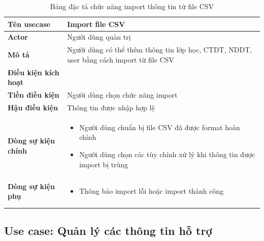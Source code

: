 \documentclass[report.tex]{subfiles}
\begin{document}
\pagebreak %
\begin{table}[!ht]
\begin{longtable}{|p{4cm}|p{12cm}|}
\hline
\textbf{Tên usecase} & \textbf{Import file CSV} \\
\hline
\textbf{Actor} & Người dùng quản trị \\
\hline
\textbf{Mô tả} & Người dùng có thể thêm thông tin lớp học, CTDT, NDDT, user bằng cách import từ file CSV \\
\hline
\textbf{Điều kiện kích hoạt} &  \\
\hline
\textbf{Tiền điều kiện} & Người dùng chọn chức năng import \\
\hline
\textbf{Hậu điều kiện} &  Thông tin được nhập hợp lệ \\
\hline
\textbf{Dòng sự kiện chính} &
\begin{itemize}[noitemsep]
  \item Người dùng chuẩn bị file CSV đã được format hoàn chỉnh
  \item Người dùng chọn các tùy chỉnh xử lý khi thông tin được import bị trùng
\end{itemize}\\
\hline
\textbf{Dòng sự kiện phụ} & 
\begin{itemize}[noitemsep]
  \item Thông báo import lỗi hoặc import thành công
\end{itemize}\\
\hline
\caption{Bảng đặc tả chức năng import thông tin từ file CSV}
\end{longtable}
\end{table}
\FloatBarrier


\subsection{Use case: Quản lý các thông tin hỗ trợ}
\end{document}
